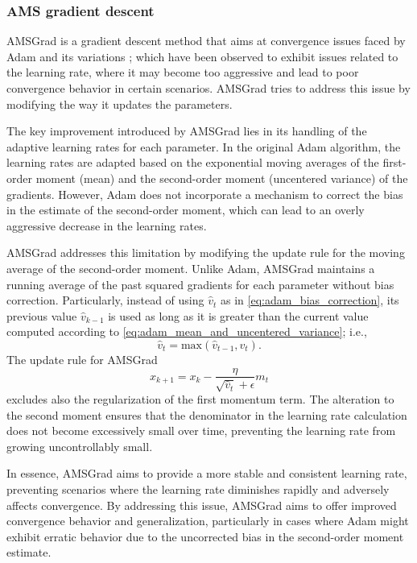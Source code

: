 \subsubsection{AMS gradient descent}


AMSGrad is a gradient descent method that aims at convergence issues faced by Adam and its variations \cite{Reddi2019convergenceadam}; which have been observed to exhibit issues related to the learning rate, where it may become too aggressive and lead to poor convergence behavior in certain scenarios. AMSGrad tries to address this issue by modifying the way it updates the parameters. 

The key improvement introduced by AMSGrad lies in its handling of the adaptive learning rates for each parameter. In the original Adam algorithm, the learning rates are adapted based on the exponential moving averages of the first-order moment (mean) and the second-order moment (uncentered variance) of the gradients. However, Adam does not incorporate a mechanism to correct the bias in the estimate of the second-order moment, which can lead to an overly aggressive decrease in the learning rates.

AMSGrad addresses this limitation by modifying the update rule for the moving average of the second-order moment. Unlike Adam, AMSGrad maintains a running average of the past squared gradients for each parameter without bias correction. Particularly, instead of using $\hat{v}_t$ as in \eqref{eq:adam_bias_correction}, its previous value $\hat{v}_{k-1}$ is used as long as it is greater than the current value computed according to \eqref{eq:adam_mean_and_uncentered_variance}; i.e.,
\begin{equation}
	\hat{v}_t = \text{max}(\hat{v}_{t-1}, v_t).
\end{equation}
The update rule for AMSGrad 
\begin{equation}
	x_{k+1} = x_{k} - \dfrac{\eta}{\sqrt{\hat{v}_t} + \epsilon} m_t
\end{equation}
excludes also the regularization of the first momentum term. The alteration to the second moment ensures that the denominator in the learning rate calculation does not become excessively small over time, preventing the learning rate from growing uncontrollably small.

In essence, AMSGrad aims to provide a more stable and consistent learning rate, preventing scenarios where the learning rate diminishes rapidly and adversely affects convergence. By addressing this issue, AMSGrad aims to offer improved convergence behavior and generalization, particularly in cases where Adam might exhibit erratic behavior due to the uncorrected bias in the second-order moment estimate.

